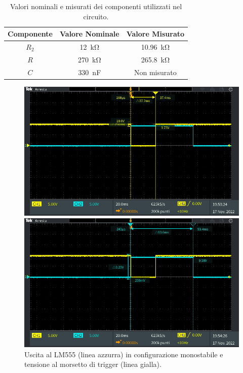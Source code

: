 \def\arraystretch{1.3}
\begin{table}[h!]
	\centering
	\begin{tabular}{|c|c|c|}
		\hline
		Componente	& Valore Nominale & Valore Misurato \\ \hline
		$R_2$ &\SI{12}{\kilo\ohm} & \SI{10.96}{\kilo\ohm} \\ \hline
		$R$ &\SI{270}{\kilo\ohm} & \SI{265.8}{\kilo\ohm} \\ \hline
		$C$ &\SI{330}{\nano\farad} & Non misurato \\ \hline
	\end{tabular}
	\caption{Valori nominali e misurati dei componenti utilizzati nel circuito.}
	\label{tab:valori_componenti_1}
\end{table}
\begin{figure}[tbh]
	\centering
	\begin{minipage}{.496\textwidth}
		\includegraphics[width=\linewidth]{./ImageFiles/Laboratorio 5/TEK00005.PNG}
	\end{minipage}
	\begin{minipage}{.496\textwidth}
		\includegraphics[width=\linewidth]{./ImageFiles/Laboratorio 5/TEK00006.PNG}
	\end{minipage}
	\caption{Uscita al LM555 (linea azzurra) in configurazione monostabile e tensione al morsetto di trigger (linea gialla).}
	\label{fig:circuito_1_scope}
\end{figure}



